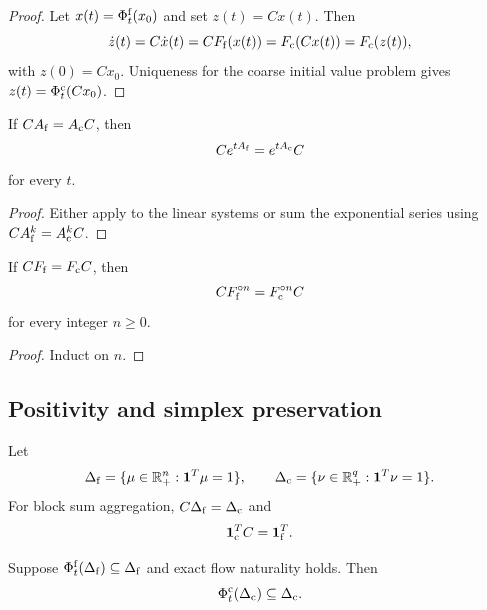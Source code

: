 \begin{proof}
Let $x(t)=\Phi_t^{\mathrm f}(x_0)$ and set $z(t)=Cx(t)$.  Then
\[
  \dot z(t)
  =C\dot x(t)
  =CF_{\mathrm f}(x(t))
  =F_{\mathrm c}(Cx(t))
  =F_{\mathrm c}(z(t)),
\]
with $z(0)=Cx_0$.  Uniqueness for the coarse initial value problem gives $z(t)=\Phi_t^{\mathrm c}(Cx_0)$.
\end{proof}

\begin{PRIQcorollary}\label{PRIQ:cor:linear-semigroup-naturality}
If $CA_{\mathrm f}=A_{\mathrm c}C$, then
\begin{equation}\label{PRIQ:eq:linear-semigroup-naturality}
  Ce^{tA_{\mathrm f}}
  =
  e^{tA_{\mathrm c}}C
\end{equation}
for every $t$.
\end{PRIQcorollary}

\begin{proof}
Either apply  to the linear systems or sum the exponential series using $CA_{\mathrm f}^k=A_{\mathrm c}^kC$.
\end{proof}

\begin{PRIQcorollary}\label{PRIQ:cor:discrete-quotient}
If $CF_{\mathrm f}=F_{\mathrm c}C$, then
\[
  CF_{\mathrm f}^{\circ n}
  =
  F_{\mathrm c}^{\circ n}C
\]
for every integer $n\geq0$.
\end{PRIQcorollary}

\begin{proof}
Induct on $n$.
\end{proof}

\subsection{Positivity and simplex preservation}
Let
\[
  \Delta_{\mathrm f}
  =\{\mu\in\mathbb R_+^n:\mathbf 1^T\mu=1\},
  \qquad
  \Delta_{\mathrm c}
  =\{\nu\in\mathbb R_+^q:\mathbf 1^T\nu=1\}.
\]
For block sum aggregation, $C\Delta_{\mathrm f}=\Delta_{\mathrm c}$ and
\[
  \mathbf 1_{\mathrm c}^TC=\mathbf 1_{\mathrm f}^T.
\]

\begin{PRIQproposition}\label{PRIQ:prop:simplex-descends}
Suppose $\Phi_t^{\mathrm f}(\Delta_{\mathrm f})\subseteq\Delta_{\mathrm f}$ and exact flow naturality holds.  Then
\[
  \Phi_t^{\mathrm c}(\Delta_{\mathrm c})\subseteq\Delta_{\mathrm c}.
\]
\end{PRIQproposition}

